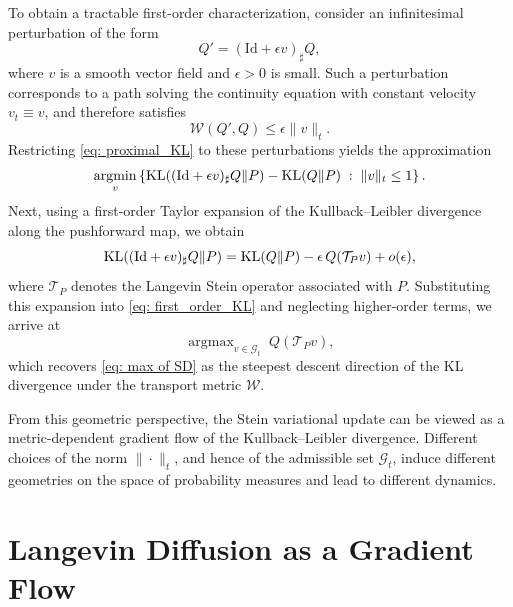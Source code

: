 \documentclass[12pt,paper=letter]{scrreprt}
\def\KL#1#2{\textnormal{KL}({#1}\Vert{#2})}
\providecommand{\argmax}{\mathop\mathrm{arg max}} %
\providecommand{\argmin}{\mathop\mathrm{arg min}}
\def\Id{\mathrm{Id}} %
\begin{document}
To obtain a tractable first-order characterization, consider an infinitesimal perturbation of the form
\[
Q' = (\Id + \epsilon v)_\sharp Q,
\]
where $v$ is a smooth vector field and $\epsilon > 0$ is small.
Such a perturbation corresponds to a path solving the continuity equation with constant velocity $v_t \equiv v$, and therefore satisfies
\[
\mathcal{W}(Q',Q) \le \epsilon \|v\|_t .
\]
Restricting \eqref{eq: proximal_KL} to these perturbations yields the approximation
\begin{equation}
\argmin_{v}
\left\{
\KL{(\Id + \epsilon v)_\sharp Q}{P} - \KL{Q}{P}
\;:\;
\|v\|_t \le 1
\right\}.
\label{eq: first_order_KL}
\end{equation}
Next, using a first-order Taylor expansion of the Kullback--Leibler divergence along the pushforward map, we obtain
\[
\KL{(\Id + \epsilon v)_\sharp Q}{P}
=
\KL{Q}{P}
-
\epsilon \, Q(\mathcal{T}_P v)
+ o(\epsilon),
\]
where $\mathcal{T}_P$ denotes the Langevin Stein operator associated with $P$.
Substituting this expansion into \eqref{eq: first_order_KL} and neglecting higher-order terms, we arrive at
\[
\argmax_{v \in \mathcal{G}_t} \; Q(\mathcal{T}_P v),
\]
which recovers \eqref{eq: max of SD} as the steepest descent direction of the KL divergence under the transport metric $\mathcal{W}$.

From this geometric perspective, the Stein variational update can be viewed as a metric-dependent gradient flow of the Kullback--Leibler divergence.
Different choices of the norm $\|\cdot\|_t$, and hence of the admissible set $\mathcal{G}_t$, induce different geometries on the space of probability measures and lead to different dynamics.










\section{Langevin Diffusion as a Gradient Flow}
\end{document}

